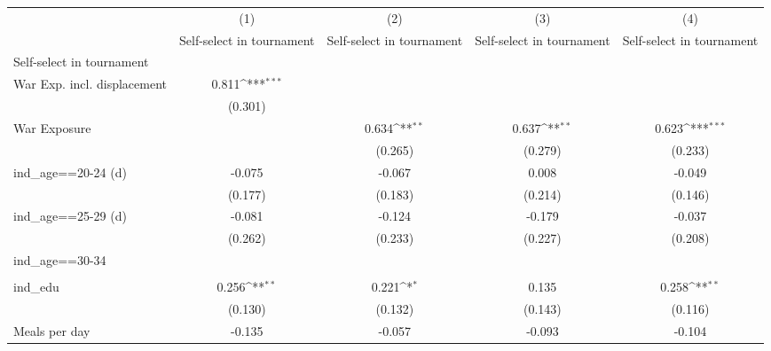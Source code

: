 {
\def\sym#1{\ifmmode^{#1}\else\(^{#1}\)\fi}
\begin{tabular}{l*{4}{c}}
\hline\hline
                    &\multicolumn{1}{c}{(1)}&\multicolumn{1}{c}{(2)}&\multicolumn{1}{c}{(3)}&\multicolumn{1}{c}{(4)}\\
                    &\multicolumn{1}{c}{Self-select in tournament}&\multicolumn{1}{c}{Self-select in tournament}&\multicolumn{1}{c}{Self-select in tournament}&\multicolumn{1}{c}{Self-select in tournament}\\
\hline
Self-select in tournament&                     &                     &                     &                     \\
War Exp. incl. displacement&       0.811\sym{***}&                     &                     &                     \\
                    &     (0.301)         &                     &                     &                     \\
[1em]
War Exposure        &                     &       0.634\sym{**} &       0.637\sym{**} &       0.623\sym{***}\\
                    &                     &     (0.265)         &     (0.279)         &     (0.233)         \\
[1em]
ind\_age==20-24 (d)  &      -0.075         &      -0.067         &       0.008         &      -0.049         \\
                    &     (0.177)         &     (0.183)         &     (0.214)         &     (0.146)         \\
[1em]
ind\_age==25-29 (d)  &      -0.081         &      -0.124         &      -0.179         &      -0.037         \\
                    &     (0.262)         &     (0.233)         &     (0.227)         &     (0.208)         \\
[1em]
ind\_age==30-34      &                     &                     &                     &                     \\
                    &                     &                     &                     &                     \\
[1em]
ind\_edu             &       0.256\sym{**} &       0.221\sym{*}  &       0.135         &       0.258\sym{**} \\
                    &     (0.130)         &     (0.132)         &     (0.143)         &     (0.116)         \\
[1em]
Meals per day       &      -0.135         &      -0.057         &      -0.093         &      -0.104         \\

\end{tabular}}
